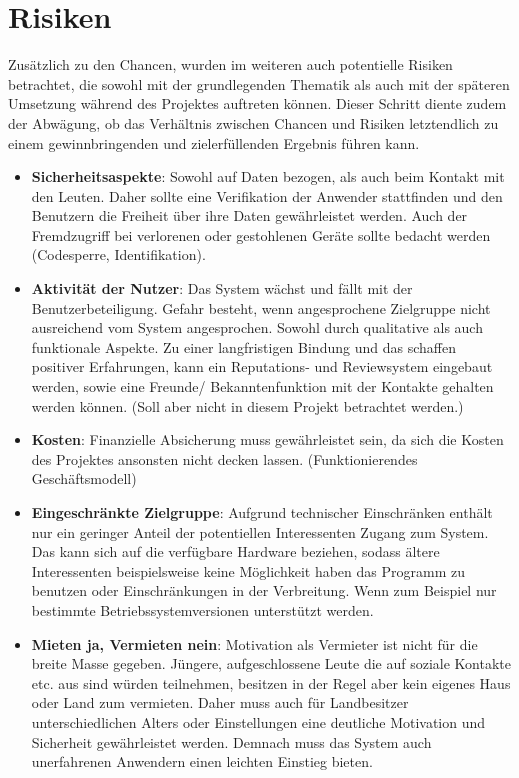 
\section{Risiken}
Zusätzlich zu den Chancen, wurden im weiteren auch potentielle Risiken betrachtet, die sowohl mit der grundlegenden Thematik als auch mit der späteren Umsetzung während des Projektes auftreten können.
Dieser Schritt diente zudem der Abwägung, ob das Verhältnis zwischen Chancen und Risiken letztendlich zu einem gewinnbringenden und zielerfüllenden Ergebnis führen kann.\\

\begin{itemize}
   \item \textbf{Sicherheitsaspekte}: Sowohl auf Daten bezogen, als auch beim Kontakt mit den Leuten. Daher sollte eine Verifikation der Anwender stattfinden und den Benutzern die Freiheit über ihre Daten gewährleistet werden. Auch der Fremdzugriff bei verlorenen oder gestohlenen Geräte sollte bedacht werden (Codesperre, Identifikation).

   \item \textbf{Aktivität der Nutzer}: Das System wächst und fällt mit der Benutzerbeteiligung. Gefahr besteht, wenn angesprochene Zielgruppe nicht ausreichend vom System angesprochen. Sowohl durch qualitative als auch funktionale Aspekte. Zu einer langfristigen Bindung und das schaffen positiver Erfahrungen, kann ein Reputations- und Reviewsystem eingebaut werden, sowie eine Freunde/ Bekanntenfunktion mit der Kontakte gehalten werden können. (Soll aber nicht in diesem Projekt betrachtet werden.)

   \item \textbf{Kosten}: Finanzielle Absicherung muss gewährleistet sein, da sich die Kosten des Projektes ansonsten nicht decken lassen. 
   (Funktionierendes Geschäftsmodell)

   \item \textbf{Eingeschränkte Zielgruppe}:
   Aufgrund technischer Einschränken enthält nur ein geringer Anteil der potentiellen Interessenten Zugang zum System. Das kann sich auf die verfügbare Hardware beziehen, sodass ältere Interessenten beispielsweise keine Möglichkeit haben das Programm zu benutzen oder Einschränkungen in der Verbreitung. Wenn zum Beispiel nur bestimmte Betriebssystemversionen unterstützt werden.
     
   \item
   \textbf{Mieten ja, Vermieten nein}: Motivation als Vermieter ist nicht für die breite Masse gegeben. Jüngere, aufgeschlossene Leute die auf soziale Kontakte etc. aus sind würden teilnehmen, besitzen in der Regel aber kein eigenes Haus oder Land zum vermieten. Daher muss auch für Landbesitzer unterschiedlichen Alters oder Einstellungen eine deutliche Motivation und Sicherheit gewährleistet werden. Demnach muss das System auch unerfahrenen Anwendern einen leichten Einstieg bieten.


\end{itemize}
